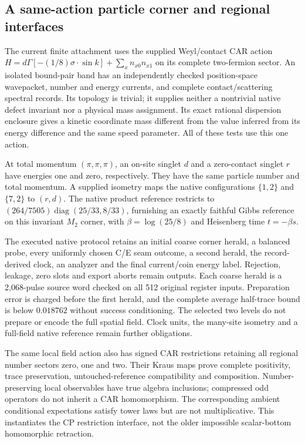 \subsection{A same-action particle corner and regional interfaces}
\label{subsec:same-action-finite-interfaces}

The current finite attachment uses the supplied Weyl/contact CAR action
$H=d\Gamma[-(1/8)\sigma\cdot\sin k]+\sum_x n_{x0}n_{x1}$ on its
complete two-fermion sector. An isolated bound-pair band has an independently
checked position-space wavepacket, number and energy currents, and complete
contact/scattering spectral records. Its topology is trivial; it supplies
neither a nontrivial native defect invariant nor a physical mass assignment.
Its exact rational dispersion enclosure gives a kinetic coordinate mass
different from the value inferred from its energy difference and the same
speed parameter. All of these tests use this one action.

At total momentum $(\pi,\pi,\pi)$, an on-site singlet $d$ and a
zero-contact singlet $r$ have energies one and zero, respectively. They
have the same particle number and total momentum. A supplied isometry
maps the native configurations $\{1,2\}$ and $\{7,2\}$ to $(r,d)$.
The native product reference restricts to
$(264/7505)\operatorname{diag}(25/33,8/33)$, furnishing an exactly
faithful Gibbs reference on this invariant $M_2$ corner, with
$\beta=\log(25/8)$ and Heisenberg time $t=-\beta s$.

The executed native protocol retains an initial coarse corner herald,
a balanced probe, every uniformly chosen C/E seam outcome, a second
herald, the record-derived clock, an analyzer and the final current/coin
energy label. Rejection, leakage, zero slots and export aborts remain
outputs. Each coarse herald is a 2,068-pulse source word checked on all
512 original register inputs. Preparation error is charged before the
first herald, and the complete average half-trace bound is below
$0.018762$ without success conditioning. The selected two levels do not
prepare or encode the full spatial field. Clock units, the many-site
isometry and a full-field native reference remain further obligations.

The same local field action also has signed CAR restrictions retaining
all regional number sectors zero, one and two. Their Kraus maps prove
complete positivity, trace preservation, untouched-reference compatibility
and composition. Number-preserving local observables have true algebra
inclusions; compressed odd operators do not inherit a CAR homomorphism.
The corresponding ambient conditional expectations satisfy tower laws
but are not multiplicative. This instantiates the CP restriction interface,
not the older impossible scalar-bottom homomorphic retraction.

